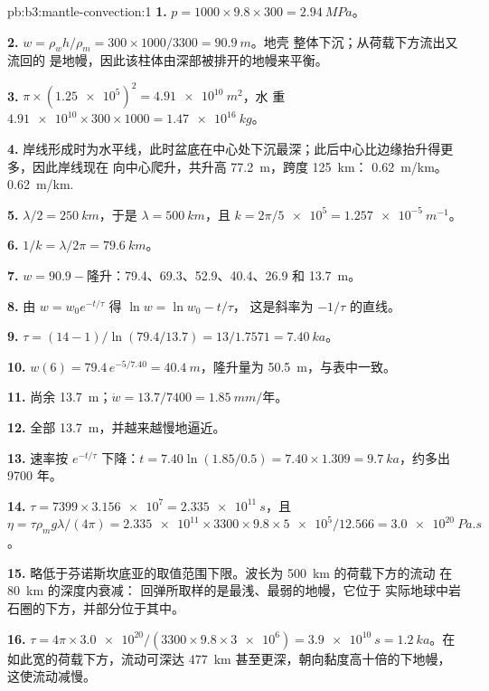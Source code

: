 \begin{solution}{pb:b3:mantle-convection:1}
\textbf{1.} $p = 1000\times9.8\times300 = \qty{2.94}{MPa}$。

\textbf{2.} $w = \rho_wh/\rho_m = 300\times1000/3300 = \qty{90.9}{m}$。地壳
整体下沉；从荷载下方流出又流回的
是地幔，因此该柱体由深部被排开的地幔来平衡。

\textbf{3.} $\pi\times(\num{1.25e5})^2 = \qty{4.91e10}{m^2}$，水
重 $\num{4.91e10}\times300\times1000 = \qty{1.47e16}{kg}$。

\textbf{4.} 岸线形成时为水平线，此时盆底在中心处下沉最深；此后中心比边缘抬升得更多，因此岸线现在
向中心爬升，共升高 \qty{77.2}{m}，跨度 \qty{125}{km}：
\qty{0.62}{m/km}。
\qty{0.62}{m/km}.

\textbf{5.} $\lambda/2 = \qty{250}{km}$，于是 $\lambda = \qty{500}{km}$，且 $k =
2\pi/\num{5e5} = \qty{1.257e-5}{m^{-1}}$。

\textbf{6.} $1/k = \lambda/2\pi = \qty{79.6}{km}$。

\textbf{7.} $w = 90.9 - \text{隆升}$：79.4、69.3、52.9、40.4、26.9 和
\qty{13.7}{m}。

\textbf{8.} 由 $w = w_0e^{-t/\tau}$ 得 $\ln w = \ln w_0 - t/\tau$，
这是斜率为 $-1/\tau$ 的直线。

\textbf{9.} $\tau = (14 - 1)/\ln(79.4/13.7) = 13/1.7571 = \qty{7.40}{ka}$。

\textbf{10.} $w(6) = 79.4\,e^{-5/7.40} = \qty{40.4}{m}$，隆升量为
\qty{50.5}{m}，与表中一致。

\textbf{11.} 尚余 \qty{13.7}{m}；$\dot w = 13.7/7400 = \qty{1.85}{mm/\text{年}}$。

\textbf{12.} 全部 \qty{13.7}{m}，并越来越慢地逼近。

\textbf{13.} 速率按 $e^{-t/\tau}$ 下降：$t = 7.40\ln(1.85/0.5) =
7.40\times1.309 = \qty{9.7}{ka}$，约多出 9700 年。

\textbf{14.} $\tau = 7399\times\num{3.156e7} = \qty{2.335e11}{s}$，且 $\eta =
\tau\rho_mg\lambda/(4\pi) = \num{2.335e11}\times3300\times9.8\times\num{5e5}/
12.566 = \qty{3.0e20}{Pa.s}$。

\textbf{15.} 略低于芬诺斯坎底亚的取值范围下限。波长为 \qty{500}{km} 的荷载下方的流动
在 \qty{80}{km} 的深度内衰减：
回弹所取样的是最浅、最弱的地幔，它位于
实际地球中岩石圈的下方，并部分位于其中。

\textbf{16.} $\tau = 4\pi\times\num{3.0e20}/(3300\times9.8\times\num{3e6}) =
\qty{3.9e10}{s} = \qty{1.2}{ka}$。在如此宽的荷载下方，流动可深达
\qty{477}{km} 甚至更深，朝向黏度高十倍的下地幔，
这使流动减慢。


\end{solution}
